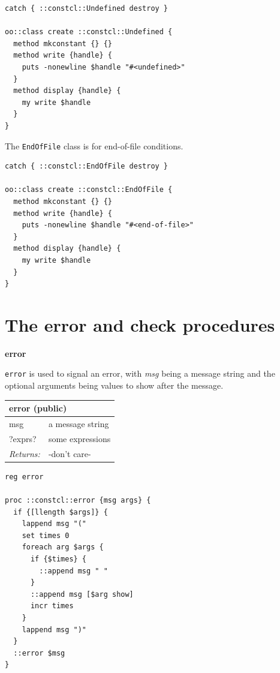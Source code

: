 \documentclass[twoside,9pt]{report}
\begin{document}
\noindent\makebox[\linewidth]{\rule{\linewidth}{0.4pt}}
\begin{lstlisting}
catch { ::constcl::Undefined destroy }
 
oo::class create ::constcl::Undefined {
  method mkconstant {} {}
  method write {handle} {
    puts -nonewline $handle "#<undefined>"
  }
  method display {handle} {
    my write $handle
  }
}
\end{lstlisting}
\noindent\makebox[\linewidth]{\rule{\linewidth}{0.4pt}}

The \texttt{EndOfFile} class is for end-of-file conditions.

\noindent\makebox[\linewidth]{\rule{\linewidth}{0.4pt}}
\begin{lstlisting}
catch { ::constcl::EndOfFile destroy }
 
oo::class create ::constcl::EndOfFile {
  method mkconstant {} {}
  method write {handle} {
    puts -nonewline $handle "#<end-of-file>"
  }
  method display {handle} {
    my write $handle
  }
}
\end{lstlisting}
\noindent\makebox[\linewidth]{\rule{\linewidth}{0.4pt}}
\section{The error and check procedures}
\label{the-error-and-check-procedures}

\textbf{error}


\texttt{error} is used to signal an error, with \emph{msg} being a message string and the optional arguments being values to show after the message.

\begin{tabular}{ |l l| }
\hline
\multicolumn{2}{|l|}{error (public)} \\
\hline
msg & a message string \\
?exprs? & some expressions \\
\textit{Returns:} & -don't care- \\
\hline
\end{tabular}

\noindent\makebox[\linewidth]{\rule{\linewidth}{0.4pt}}
\begin{lstlisting}
reg error
 
proc ::constcl::error {msg args} {
  if {[llength $args]} {
    lappend msg "("
    set times 0
    foreach arg $args {
      if {$times} {
        ::append msg " "
      }
      ::append msg [$arg show]
      incr times
    }
    lappend msg ")"
  }
  ::error $msg
}
\end{lstlisting}
\noindent\makebox[\linewidth]{\rule{\linewidth}{0.4pt}}
\end{document}
